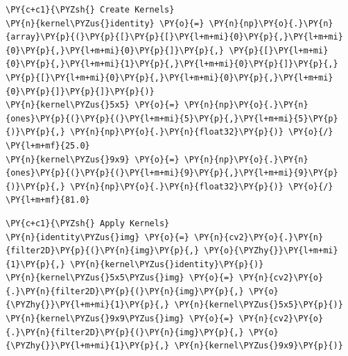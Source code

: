 \begin{tcolorbox}[breakable, size=fbox, boxrule=1pt, pad at break*=1mm,colback=cellbackground, colframe=cellborder]
	\begin{Verbatim}[commandchars=\\\{\}]
\PY{c+c1}{\PYZsh{} Create Kernels}
\PY{n}{kernel\PYZus{}identity} \PY{o}{=} \PY{n}{np}\PY{o}{.}\PY{n}{array}\PY{p}{(}\PY{p}{[}\PY{p}{[}\PY{l+m+mi}{0}\PY{p}{,}\PY{l+m+mi}{0}\PY{p}{,}\PY{l+m+mi}{0}\PY{p}{]}\PY{p}{,} \PY{p}{[}\PY{l+m+mi}{0}\PY{p}{,}\PY{l+m+mi}{1}\PY{p}{,}\PY{l+m+mi}{0}\PY{p}{]}\PY{p}{,} \PY{p}{[}\PY{l+m+mi}{0}\PY{p}{,}\PY{l+m+mi}{0}\PY{p}{,}\PY{l+m+mi}{0}\PY{p}{]}\PY{p}{]}\PY{p}{)}
\PY{n}{kernel\PYZus{}5x5} \PY{o}{=} \PY{n}{np}\PY{o}{.}\PY{n}{ones}\PY{p}{(}\PY{p}{(}\PY{l+m+mi}{5}\PY{p}{,}\PY{l+m+mi}{5}\PY{p}{)}\PY{p}{,} \PY{n}{np}\PY{o}{.}\PY{n}{float32}\PY{p}{)} \PY{o}{/} \PY{l+m+mf}{25.0}
\PY{n}{kernel\PYZus{}9x9} \PY{o}{=} \PY{n}{np}\PY{o}{.}\PY{n}{ones}\PY{p}{(}\PY{p}{(}\PY{l+m+mi}{9}\PY{p}{,}\PY{l+m+mi}{9}\PY{p}{)}\PY{p}{,} \PY{n}{np}\PY{o}{.}\PY{n}{float32}\PY{p}{)} \PY{o}{/} \PY{l+m+mf}{81.0}
	\end{Verbatim}
\end{tcolorbox}

\begin{tcolorbox}[breakable, size=fbox, boxrule=1pt, pad at break*=1mm,colback=cellbackground, colframe=cellborder]
	\begin{Verbatim}[commandchars=\\\{\}]
\PY{c+c1}{\PYZsh{} Apply Kernels}
\PY{n}{identity\PYZus{}img} \PY{o}{=} \PY{n}{cv2}\PY{o}{.}\PY{n}{filter2D}\PY{p}{(}\PY{n}{img}\PY{p}{,} \PY{o}{\PYZhy{}}\PY{l+m+mi}{1}\PY{p}{,} \PY{n}{kernel\PYZus{}identity}\PY{p}{)}
\PY{n}{kernel\PYZus{}5x5\PYZus{}img} \PY{o}{=} \PY{n}{cv2}\PY{o}{.}\PY{n}{filter2D}\PY{p}{(}\PY{n}{img}\PY{p}{,} \PY{o}{\PYZhy{}}\PY{l+m+mi}{1}\PY{p}{,} \PY{n}{kernel\PYZus{}5x5}\PY{p}{)}
\PY{n}{kernel\PYZus{}9x9\PYZus{}img} \PY{o}{=} \PY{n}{cv2}\PY{o}{.}\PY{n}{filter2D}\PY{p}{(}\PY{n}{img}\PY{p}{,} \PY{o}{\PYZhy{}}\PY{l+m+mi}{1}\PY{p}{,} \PY{n}{kernel\PYZus{}9x9}\PY{p}{)}
	\end{Verbatim}
\end{tcolorbox}

